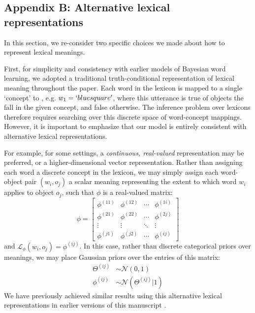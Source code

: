 \documentclass[11pt, floatsintext]{apa6}
\begin{document}
\subsection{Appendix B: Alternative lexical representations}

In this section, we re-consider two specific choices we made about how to represent lexical meanings.

First, for simplicity and consistency with earlier models of Bayesian word learning, we adopted a traditional truth-conditional representation of lexical meaning throughout the paper. 
Each word in the lexicon is mapped to a single `concept' to , e.g. $w_1 = `blue square'$, where this utterance is true of objects the fall in the given concept, and false otherwise. 
The inference problem over lexicons therefore requires searching over this discrete space of word-concept mappings. 
However, it is important to emphasize that our model is entirely consistent with alternative lexical representations.

For example, for some settings, a \emph{continuous, real-valued} representation may be preferred, or a higher-dimensional vector representation.
Rather than assigning each word a discrete concept in the lexicon, we may simply assign each word-object pair $(w_i,o_j)$ a scalar meaning representing the extent to which word $w_i$ applies to object $o_j$, such that $\phi$ is a real-valued matrix:
$$
\phi = \begin{bmatrix}
\phi^{(11)} & \phi^{(12)} & \cdots & \phi^{(1i)} \\
\phi^{(21)} & \phi^{(22)} & \cdots & \phi^{(2j)} \\
\vdots & \vdots &\ddots & \vdots \\
\phi^{(j1)} & \phi^{(j2)} & \cdots & \phi^{(ij)} 
\end{bmatrix}
$$
and $\mathcal{L}_\phi(w_i, o_j) = \phi^{(ij)}$. 
In this case, rather than discrete categorical priors over meanings, we may place Gaussian priors over the entries of this matrix:
\begin{align}
\Theta^{(ij)} & \sim \mathcal{N}(0,1)\nonumber \\
\phi^{(ij)} & \sim \mathcal{N}(\Theta^{(ij)} | 1)\nonumber
\end{align}
We have previously achieved similar results using this alternative lexical representations in earlier versions of this manuscript \cite{hawkins_convention-formation_2017,hawkins2020generalizing}.
\end{document}
